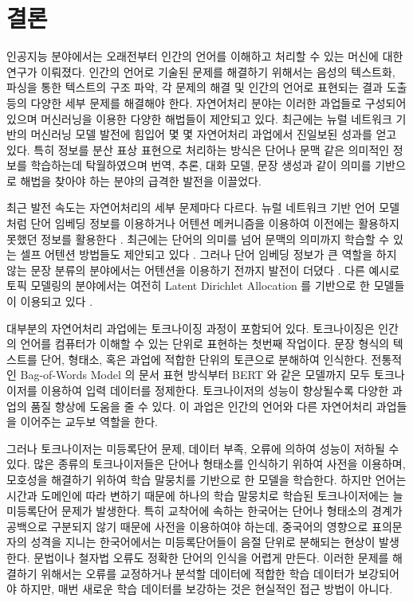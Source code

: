 \documentclass[oneside, ko,phd]{snuthesis_utf8_kor}
\begin{document}
\newpage
\chapter{결론} \label{conclusion}

인공지능 분야에서는 오래전부터 인간의 언어를 이해하고 처리할 수 있는 머신에 대한 연구가 이뤄졌다.
인간의 언어로 기술된 문제를 해결하기 위해서는 음성의 텍스트화, 파싱을 통한 텍스트의 구조 파악, 각 문제의 해결 및 인간의 언어로 표현되는 결과 도출 등의 다양한 세부 문제를 해결해야 한다.
자연어처리 분야는 이러한 과업들로 구성되어 있으며 머신러닝을 이용한 다양한 해법들이 제안되고 있다.
최근에는 뉴럴 네트워크 기반의 머신러닝 모델 발전에 힘입어 몇 몇 자연어처리 과업에서 진일보된 성과를 얻고 있다.
특히 정보를 분산 표상 표현으로 처리하는 방식은 단어나 문맥 같은 의미적인 정보를 학습하는데 탁월하였으며 번역, 추론, 대화 모델, 문장 생성과 같이 의미를 기반으로 해법을 찾아야 하는 분야의 급격한 발전을 이끌었다.

최근 발전 속도는 자연어처리의 세부 문제마다 다르다.
뉴럴 네트워크 기반 언어 모델처럼 단어 임베딩 정보를 이용하거나 어텐션 메커니즘을 이용하여 이전에는 활용하지 못했던 정보를 활용한다 \cite{joulin2016bag, bahdanau2014neural, lin2017structured}.
최근에는 단어의 의미를 넘어 문맥의 의미까지 학습할 수 있는 셀프 어텐션 방법들도 제안되고 있다 \cite{vaswani2017attention, devlin2018bert}.
그러나 단어 임베딩 정보가 큰 역할을 하지 않는 문장 분류의 분야에서는 어텐션을 이용하기 전까지 발전이 더뎠다 \cite{yang2016hierarchical}.
다른 예시로 토픽 모델링의 분야에서는 여전히 Latent Dirichlet Allocation \cite{blei2003latent} 를 기반으로 한 모델들이 이용되고 있다 \cite{allahyari2017brief}.

대부분의 자연어처리 과업에는 토크나이징 과정이 포함되어 있다.
토크나이징은 인간의 언어를 컴퓨터가 이해할 수 있는 단위로 표현하는 첫번째 작업이다.
문장 형식의 텍스트를 단어, 형태소, 혹은 과업에 적합한 단위의 토큰으로 분해하여 인식한다.
전통적인 Bag-of-Words Model 의 문서 표현 방식부터 BERT 와 같은 모델까지 모두 토크나이저를 이용하여 입력 데이터를 정제한다.
토크나이저의 성능이 향상될수록 다양한 과업의 품질 향상에 도움을 줄 수 있다.
이 과업은 인간의 언어와 다른 자연어처리 과업들을 이어주는 교두보 역할을 한다.

그러나 토크나이저는 미등록단어 문제, 데이터 부족, 오류에 의하여 성능이 저하될 수 있다.
많은 종류의 토크나이저들은 단어나 형태소를 인식하기 위하여 사전을 이용하며, 모호성을 해결하기 위하여 학습 말뭉치를 기반으로 한 모델을 학습한다.
하지만 언어는 시간과 도메인에 따라 변하기 때문에 하나의 학습 말뭉치로 학습된 토크나이저에는 늘 미등록단어 문제가 발생한다.
특히 교착어에 속하는 한국어는 단어나 형태소의 경계가 공백으로 구분되지 않기 때문에 사전을 이용하여야 하는데, 중국어의 영향으로 표의문자의 성격을 지니는 한국어에서는 미등록단어들이 음절 단위로 분해되는 현상이 발생한다.
문법이나 철자법 오류도 정확한 단어의 인식을 어렵게 만든다.
이러한 문제를 해결하기 위해서는 오류를 교정하거나 분석할 데이터에 적합한 학습 데이터가 보강되어야 하지만, 매번 새로운 학습 데이터를 보강하는 것은 현실적인 접근 방법이 아니다.
\end{document}
